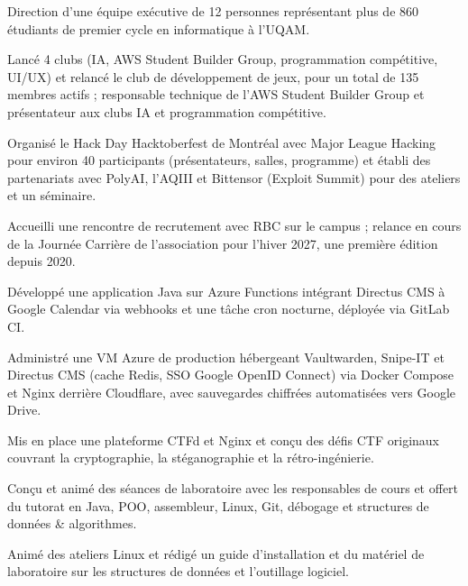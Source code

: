 \documentclass[letterpaper,10pt]{article}
\begin{document}
\begin{resume_list}
\item Direction d'une équipe exécutive de 12 personnes représentant plus de 860 étudiants de premier cycle en informatique à l'UQAM.
\item Lancé 4 clubs (IA, AWS Student Builder Group, programmation compétitive, UI/UX) et relancé le club de développement de jeux, pour un total de 135 membres actifs ; responsable technique de l'AWS Student Builder Group et présentateur aux clubs IA et programmation compétitive.
\item Organisé le Hack Day Hacktoberfest de Montréal avec Major League Hacking pour environ 40 participants (présentateurs, salles, programme) et établi des partenariats avec PolyAI, l'AQIII et Bittensor (Exploit Summit) pour des ateliers et un séminaire.
\item Accueilli une rencontre de recrutement avec RBC sur le campus ; relance en cours de la Journée Carrière de l'association pour l'hiver 2027, une première édition depuis 2020.
\end{resume_list}

\begin{resume_list}
\item Développé une application Java sur Azure Functions intégrant Directus CMS à Google Calendar via webhooks et une tâche cron nocturne, déployée via GitLab CI.
\item Administré une VM Azure de production hébergeant Vaultwarden, Snipe-IT et Directus CMS (cache Redis, SSO Google OpenID Connect) via Docker Compose et Nginx derrière Cloudflare, avec sauvegardes chiffrées automatisées vers Google Drive.
\item Mis en place une plateforme CTFd et Nginx et conçu des défis CTF originaux couvrant la cryptographie, la stéganographie et la rétro-ingénierie. {\footnotesize {}}
\end{resume_list}

\begin{resume_list}
\item Conçu et animé des séances de laboratoire avec les responsables de cours et offert du tutorat en Java, POO, assembleur, Linux, Git, débogage et structures de données \& algorithmes.
\item Animé des ateliers Linux et rédigé un guide d'installation et du matériel de laboratoire sur les structures de données et l'outillage logiciel. {\footnotesize {} }
\end{resume_list}
\end{document}
